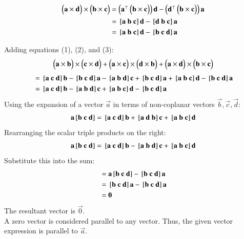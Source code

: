 \documentclass[journal]{IEEEtran}
\begin{document}
\begin{align}
\myvec{\vec{a} \times\vec{d}} \times\myvec{\vec{b} \times\vec{c}}&=
\myvec{\vec{a}^\top \myvec{\vec{b} \times \vec{c}}} \vec{d} - \myvec{\vec{d}^\top \myvec{\vec{b} \times \vec{c}}} \vec{a}\\
&=\sbrak{\vec{a} \ \vec{b} \ \vec{c}}\vec{d} - \sbrak{\vec{d} \ \vec{b} \ \vec{c}}\vec{a}  \\
&= \sbrak{\vec{a} \ \vec{b} \ \vec{c}}\vec{d} - \sbrak{\vec{b} \ \vec{c} \ \vec{d}}\vec{a}
\end{align}

Adding equations (1), (2), and (3):
\begin{align}
\begin{pmatrix}\mathbf{a} \times\mathbf{b}\end{pmatrix} \times\begin{pmatrix}\mathbf{c} \times\mathbf{d}\end{pmatrix} + \begin{pmatrix}\mathbf{a} \times\mathbf{c}\end{pmatrix} \times\begin{pmatrix}\mathbf{d} \times\mathbf{b}\end{pmatrix} + \begin{pmatrix}\mathbf{a} \times\mathbf{d}\end{pmatrix} \times\begin{pmatrix}\mathbf{b} \times\mathbf{c}\end{pmatrix}\\
\end{align}
\begin{align}
&= \sbrak{\vec{a} \ \vec{c} \ \vec{d}}\vec{b} - \sbrak{\vec{b} \ \vec{c} \ \vec{d}}\vec{a}-\sbrak{\vec{a} \ \vec{b} \ \vec{d}}\vec{c} + \sbrak{\vec{b} \ \vec{c} \ \vec{d}}\vec{a}+\sbrak{\vec{a} \ \vec{b} \ \vec{c}}\vec{d} - \sbrak{\vec{b} \ \vec{c} \ \vec{d}}\vec{a}\\
&= \sbrak{\vec{a} \ \vec{c} \ \vec{d}}\vec{b} - \sbrak{\vec{a} \ \vec{b} \ \vec{d}}\vec{c} + \sbrak{\vec{a} \ \vec{b} \ \vec{c}}\vec{d} - \sbrak{\vec{b} \ \vec{c} \ \vec{d}}\vec{a}
\end{align}
Using the expansion of a vector $\vec{a}$ in terms of non-coplanar vectors $\vec{b}, \vec{c}, \vec{d}$:
\begin{align}
\vec{a}\sbrak{\vec{b} \ \vec{c} \ \vec{d}} = \sbrak{\vec{a} \ \vec{c} \ \vec{d}}\vec{b} + \sbrak{\vec{a} \ \vec{d} \ \vec{b}}\vec{c} + \sbrak{\vec{a} \ \vec{b} \ \vec{c}}\vec{d}
\end{align}
Rearranging the scalar triple products on the right:
\begin{align}
\vec{a}\sbrak{\vec{b} \ \vec{c} \ \vec{d}} = \sbrak{\vec{a} \ \vec{c} \ \vec{d}}\vec{b} - \sbrak{\vec{a} \ \vec{b} \ \vec{d}}\vec{c} + \sbrak{\vec{a} \ \vec{b} \ \vec{c}}\vec{d}
\end{align}
Substitute this into the sum:
\begin{align}
&= \vec{a}\sbrak{\vec{b} \ \vec{c} \ \vec{d}} - \sbrak{\vec{b} \ \vec{c} \ \vec{d}}\vec{a} \\
&= \sbrak{\vec{b} \ \vec{c} \ \vec{d}}\vec{a} - \sbrak{\vec{b} \ \vec{c} \ \vec{d}}\vec{a} \\
&= \vec{0}
\end{align}
The resultant vector is $\vec{0}$.\\ A zero vector is considered parallel to any vector.
Thus, the given vector expression is parallel to $\vec{a}$.
\end{document}
